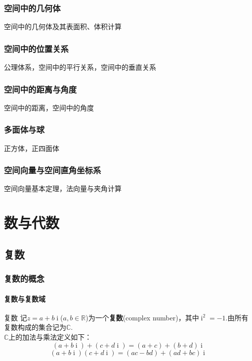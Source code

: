 \documentclass[lang=cn, zihao=5]{elegantbook}
\newcommand{\R}{\mathbb{R}}
\newcommand{\C}{\mathbb{C}}
\DeclareMathOperator{\ic}{i}
\begin{document}
\section{空间中的几何体}

空间中的几何体及其表面积、体积计算

\section{空间中的位置关系}

公理体系，空间中的平行关系，空间中的垂直关系

\section{空间中的距离与角度}

空间中的距离，空间中的角度

\section{多面体与球}

正方体，正四面体

\section{空间向量与空间直角坐标系}

空间向量基本定理，法向量与夹角计算





\part{数与代数}

\chapter{复数}

\section{复数的概念}

\subsection{复数与复数域}

\begin{definition}{复数}
	记$z=a+b\ic $($a,b \in \R$)为一个\textbf{复数}(complex number)，其中$\ic ^2=-1$.由所有复数构成的集合记为$\C$. \\
	$\C$上的加法与乘法定义如下：
	$$(a+b\ic ) + (c+d\ic ) = (a+c) + (b+d)\ic $$
	$$(a+b\ic )(c+d\ic ) = (ac-bd) + (ad+bc)\ic $$
\end{definition}
\end{document}
